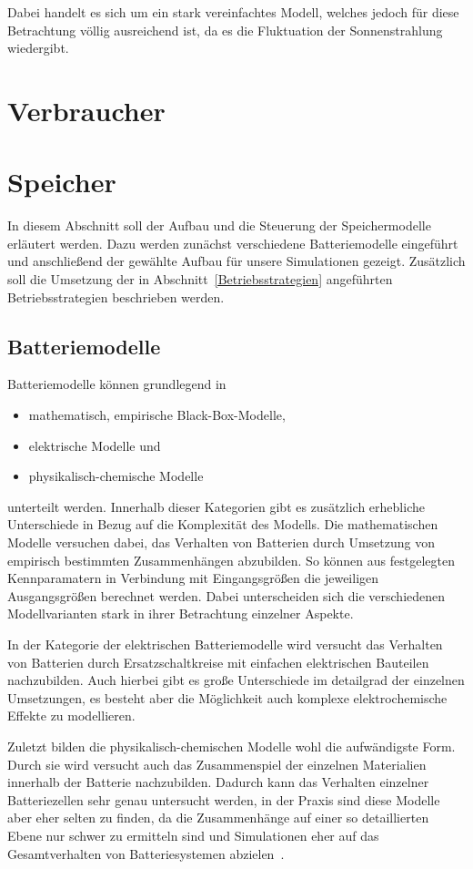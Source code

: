 Dabei handelt es sich um ein stark vereinfachtes Modell, welches jedoch für diese Betrachtung völlig ausreichend ist, da es die Fluktuation der Sonnenstrahlung wiedergibt.

\section{Verbraucher}
\section{Speicher}\label{Speicher}
In diesem Abschnitt soll der Aufbau und die Steuerung der Speichermodelle erläutert werden.
Dazu werden zunächst verschiedene Batteriemodelle eingeführt und anschließend der gewählte Aufbau für
unsere Simulationen gezeigt. 
Zusätzlich soll die Umsetzung der in Abschnitt~\ref{Betriebsstrategien} angeführten Betriebsstrategien 
beschrieben werden.

\subsection{Batteriemodelle}\label{Batteriemodelle}
Batteriemodelle können grundlegend in 
\begin{itemize}
    \item mathematisch, empirische Black-Box-Modelle,
    \item elektrische Modelle und
   \item physikalisch-chemische Modelle
\end{itemize}
unterteilt werden. 
Innerhalb dieser Kategorien gibt es zusätzlich erhebliche Unterschiede in Bezug auf die Komplexität des Modells.
Die mathematischen Modelle versuchen dabei, das Verhalten von Batterien durch Umsetzung von empirisch bestimmten
Zusammenhängen abzubilden.
So können aus festgelegten Kennparamatern in Verbindung mit Eingangsgrößen die jeweiligen Ausgangsgrößen berechnet werden.
Dabei unterscheiden sich die verschiedenen Modellvarianten stark in ihrer Betrachtung einzelner Aspekte.

In der Kategorie der elektrischen Batteriemodelle wird versucht das Verhalten von Batterien durch Ersatzschaltkreise
mit einfachen elektrischen Bauteilen nachzubilden.
Auch hierbei gibt es große Unterschiede im detailgrad der einzelnen Umsetzungen, es besteht aber die Möglichkeit
auch komplexe elektrochemische Effekte zu modellieren.

Zuletzt bilden die physikalisch-chemischen Modelle wohl die aufwändigste Form.
Durch sie wird versucht auch das Zusammenspiel der einzelnen Materialien innerhalb der Batterie nachzubilden.
Dadurch kann das Verhalten einzelner Batteriezellen sehr genau untersucht werden, in der Praxis sind diese
Modelle aber eher selten zu finden, da die Zusammenhänge auf einer so detaillierten Ebene nur schwer zu ermitteln sind
und Simulationen eher auf das Gesamtverhalten von Batteriesystemen abzielen~\parencite[]{keil2012aufbau}.

